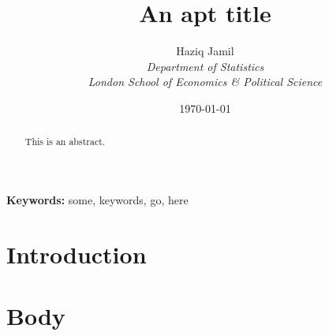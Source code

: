 \documentclass[english, 11pt]{article}\usepackage[]{graphicx}\usepackage[]{color}
\begin{document}


\title{An apt title}
\author{	Haziq Jamil\\
			\normalsize{\it{Department of Statistics}}\\
			\normalsize{\it{London School of Economics \& Political Science}}
}
\date{\normalsize\today}
\maketitle

\begin{abstract}
This is an abstract. \lipsum[1]
\end{abstract}

{\noindent\textbf{Keywords:} 
	some, keywords, go, here
}

\section{Introduction}


\section{Body}

\end{document}
